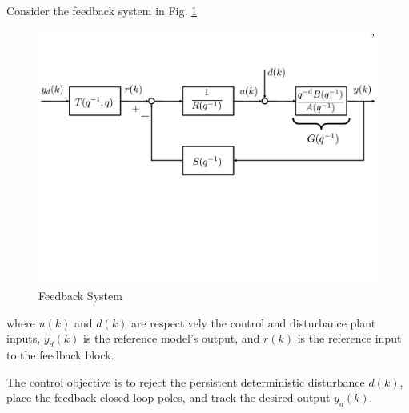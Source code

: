 \item
Consider the feedback system in Fig. \ref{pole-placement-feedback-loop}
\begin{figure}[h]
    \centering
    \includegraphics[width=4.5in]{pole-placement-feedback-loop-yd}
    \caption{Feedback System}
    \label{pole-placement-feedback-loop}
\end{figure}
where $u(k)$ and $d(k)$ are respectively the control and disturbance plant inputs, $y_d(k)$ is the reference model's output, and $r(k)$ is the reference input to the feedback block.

The control objective is to reject the persistent deterministic disturbance $d(k)$, place the feedback closed-loop poles, and  track the desired output $y_d(k)$.


